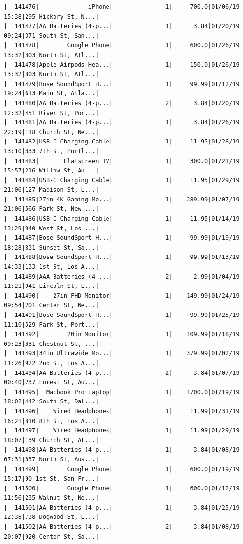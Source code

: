 \documentclass[
  letterpaper,
  DIV=11,
  numbers=noendperiod]{scrartcl}
\begin{document}
\begin{verbatim}
|  141476|              iPhone|               1|     700.0|01/06/19 15:38|295 Hickory St, N...|
|  141477|AA Batteries (4-p...|               1|      3.84|01/20/19 09:24|371 South St, San...|
|  141478|        Google Phone|               1|     600.0|01/26/19 13:32|303 North St, Atl...|
|  141478|Apple Airpods Hea...|               1|     150.0|01/26/19 13:32|303 North St, Atl...|
|  141479|Bose SoundSport H...|               1|     99.99|01/12/19 19:24|613 Main St, Atla...|
|  141480|AA Batteries (4-p...|               2|      3.84|01/20/19 12:32|451 River St, Por...|
|  141481|AA Batteries (4-p...|               1|      3.84|01/26/19 22:19|118 Church St, Ne...|
|  141482|USB-C Charging Cable|               1|     11.95|01/28/19 13:10|333 7th St, Portl...|
|  141483|       Flatscreen TV|               1|     300.0|01/21/19 15:57|216 Willow St, Au...|
|  141484|USB-C Charging Cable|               1|     11.95|01/29/19 21:06|127 Madison St, L...|
|  141485|27in 4K Gaming Mo...|               1|    389.99|01/07/19 21:06|566 Park St, New ...|
|  141486|USB-C Charging Cable|               1|     11.95|01/14/19 13:29|940 West St, Los ...|
|  141487|Bose SoundSport H...|               1|     99.99|01/19/19 18:28|831 Sunset St, Sa...|
|  141488|Bose SoundSport H...|               1|     99.99|01/13/19 14:33|133 1st St, Los A...|
|  141489|AAA Batteries (4-...|               2|      2.99|01/04/19 11:21|941 Lincoln St, L...|
|  141490|    27in FHD Monitor|               1|    149.99|01/24/19 09:54|201 Center St, Ne...|
|  141491|Bose SoundSport H...|               1|     99.99|01/25/19 11:10|529 Park St, Port...|
|  141492|        20in Monitor|               1|    109.99|01/18/19 09:23|331 Chestnut St, ...|
|  141493|34in Ultrawide Mo...|               1|    379.99|01/02/19 11:26|922 2nd St, Los A...|
|  141494|AA Batteries (4-p...|               2|      3.84|01/07/19 00:40|237 Forest St, Au...|
|  141495|  Macbook Pro Laptop|               1|    1700.0|01/19/19 18:02|442 South St, Dal...|
|  141496|    Wired Headphones|               1|     11.99|01/31/19 16:21|310 8th St, Los A...|
|  141497|    Wired Headphones|               1|     11.99|01/29/19 18:07|139 Church St, At...|
|  141498|AA Batteries (4-p...|               1|      3.84|01/08/19 07:31|337 North St, Aus...|
|  141499|        Google Phone|               1|     600.0|01/19/19 15:17|90 1st St, San Fr...|
|  141500|        Google Phone|               1|     600.0|01/12/19 11:56|235 Walnut St, Ne...|
|  141501|AA Batteries (4-p...|               1|      3.84|01/25/19 12:38|738 Dogwood St, L...|
|  141502|AA Batteries (4-p...|               2|      3.84|01/08/19 20:07|920 Center St, Sa...|

\end{verbatim}
\end{document}
